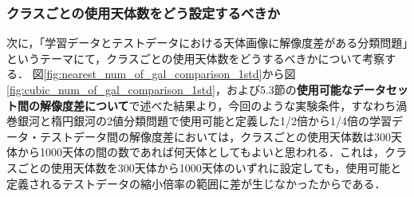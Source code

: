 \documentclass[a4j, 11pt]{jreport}
\begin{document}





\subsubsection{クラスごとの使用天体数をどう設定するべきか}
次に，「学習データとテストデータにおける天体画像に解像度差がある分類問題」というテーマにて，クラスごとの使用天体数をどうするべきかについて考察する．
図\ref{fig:nearest_num_of_gal_comparison_1std}から図\ref{fig:cubic_num_of_gal_comparison_1std}，および5.3節の\textbf{使用可能なデータセット間の解像度差について}で述べた結果より，今回のような実験条件，すなわち渦巻銀河と楕円銀河の2値分類問題で使用可能と定義した1/2倍から1/4倍の学習データ・テストデータ間の解像度差においては，クラスごとの使用天体数は300天体から1000天体の間の数であれば何天体としてもよいと思われる．これは，クラスごとの使用天体数を300天体から1000天体のいずれに設定しても，使用可能と定義されるテストデータの縮小倍率の範囲に差が生じなかったからである．
\end{document}
